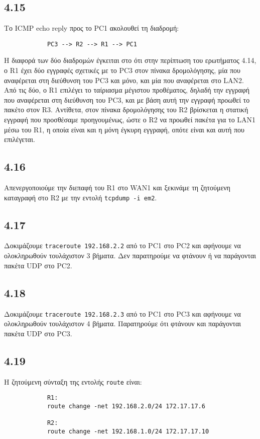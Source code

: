 \documentclass[a4paper, 12pt]{article}
\begin{document}
	\subsection*{4.15}
		Το ICMP echo reply προς το PC1 ακολουθεί τη διαδρομή:
		
		\begin{verbatim}
			PC3 --> R2 --> R1 --> PC1
		\end{verbatim}
		
		Η διαφορά των δύο διαδρομών έγκειται στο ότι στην περίπτωση του ερωτήματος 4.14, ο R1 έχει δύο εγγραφές σχετικές με το PC3 στον πίνακα δρομολόγησης, μία που αναφέρεται στη διεύθυνση του PC3 και μόνο, και μία που αναφέρεται στο LAN2. Από τις δύο, ο R1 επιλέγει το ταίριασμα μέγιστου προθέματος, δηλαδή την εγγραφή που αναφέρεται στη διεύθυνση του PC3, και με βάση αυτή την εγγραφή προωθεί το πακέτο στον R3. Αντίθετα, στον πίνακα δρομολόγησης του R2 βρίσκεται η στατική εγγραφή που προσθέσαμε προηγουμένως, ώστε ο R2 να προωθεί πακέτα για το LAN1 μέσω του R1, η οποία είναι και η μόνη έγκυρη εγγραφή, οπότε είναι και αυτή που επιλέγεται.

	\subsection*{4.16}
		Απενεργοποιούμε την διεπαφή του R1 στο WAN1 και ξεκινάμε τη ζητούμενη καταγραφή στο R2 με την εντολή \verb|tcpdump -i em2|.

	\subsection*{4.17}
		Δοκιμάζουμε \verb|traceroute 192.168.2.2| από το PC1 στο PC2 και αφήνουμε να ολοκληρωθούν τουλάχιστον 3 βήματα. Δεν παρατηρούμε να φτάνουν ή να παράγονται πακέτα UDP στο PC2. 

	\subsection*{4.18}
		Δοκιμάζουμε \verb|traceroute 192.168.2.3| από το PC1 στο PC3 και αφήνουμε να ολοκληρωθούν τουλάχιστον 4 βήματα. Παρατηρούμε ότι φτάνουν και παράγονται πακέτα UDP στο PC3. 
		
	\subsection*{4.19}
		Η ζητούμενη σύνταξη της εντολής \verb|route| είναι:
		
		\begin{verbatim}
			R1:
			route change -net 192.168.2.0/24 172.17.17.6
			
			R2:
			route change -net 192.168.1.0/24 172.17.17.10
		\end{verbatim}
		
\end{document}

